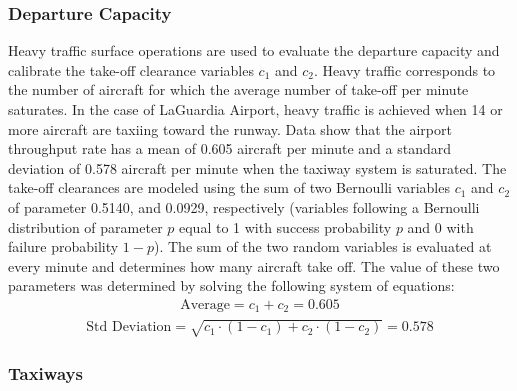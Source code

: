 \documentclass[letterpaper]{article}
\begin{document}
\subsubsection{Departure Capacity}
 Heavy traffic surface operations are used to evaluate the departure capacity and 
 calibrate the take-off clearance variables $c_1$ and $c_2$. Heavy traffic corresponds to the number of aircraft for which the average 
  number of take-off per minute saturates. In the case of LaGuardia Airport, heavy traffic is achieved when 14 or more aircraft are 
  taxiing toward the runway.
  Data show that the airport throughput rate has a mean of 0.605 aircraft per minute and a standard deviation of 0.578 aircraft
per minute when the taxiway system is saturated. The take-off clearances are modeled using the sum of two Bernoulli variables $c_1$ and $c_2$ 
of parameter 0.5140, and 0.0929, respectively (variables following a Bernoulli distribution of parameter $p$ equal to 1 with success probability
$p$ and 0 with failure probability $1-p$).  The sum of the two random variables is evaluated at every minute and determines how many aircraft 
take off. 
The value of these two parameters was determined by solving the following system of equations:
\begin{eqnarray} \label{e:c1c2equation}
  \mbox{Average} = c_1 + c_2 = 0.605
  \end{eqnarray}
  \begin{eqnarray}
\mbox{Std Deviation} = \sqrt{c_1\cdot (1-c_1) + c_2\cdot (1-c_2)} =0.578
\end{eqnarray}


\subsubsection{Taxiways}
\end{document}
